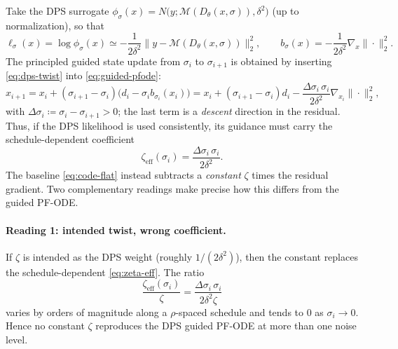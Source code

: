 \documentclass[11pt]{article}
\begin{document}
Take the DPS surrogate $\phi_\sigma(x)=N\!\bigl(y;\mathcal M(D_\theta(x,\sigma)),\delta^2\bigr)$
(up to normalization), so that
\begin{equation}\label{eq:dps-twist}
  \ell_\sigma(x) = \log\phi_\sigma(x)
  \simeq -\frac{1}{2\delta^2}\bigl\|y-\mathcal M(D_\theta(x,\sigma))\bigr\|_2^2,
  \qquad
  b_\sigma(x) = -\frac{1}{2\delta^2}\nabla_x\bigl\|\cdot\bigr\|_2^2 .
\end{equation}
The principled guided state update from $\sigma_i$ to $\sigma_{i+1}$ is obtained by inserting
\eqref{eq:dps-twist} into \eqref{eq:guided-pfode}:
\begin{equation}\label{eq:principled-update}
  x_{i+1} = x_i + (\sigma_{i+1}-\sigma_i)\bigl(d_i-\sigma_i b_{\sigma_i}(x_i)\bigr)
  = x_i + (\sigma_{i+1}-\sigma_i)d_i
  - \frac{\Delta\sigma_i\,\sigma_i}{2\delta^2}
  \nabla_{x_i}\bigl\|\cdot\bigr\|_2^2,
\end{equation}
with $\Delta\sigma_i\coloneqq\sigma_i-\sigma_{i+1}>0$; the last term is a \emph{descent} direction in
the residual. Thus, if the DPS likelihood is used consistently, its guidance must carry the
schedule-dependent coefficient
\begin{equation}\label{eq:zeta-eff}
  \zeta_{\mathrm{eff}}(\sigma_i) = \frac{\Delta\sigma_i\,\sigma_i}{2\delta^2}.
\end{equation}
The baseline \eqref{eq:code-flat} instead subtracts a \emph{constant} $\zeta$ times the residual
gradient. Two complementary readings make precise how this differs from the guided PF-ODE.

\paragraph{Reading 1: intended twist, wrong coefficient.}
If $\zeta$ is intended as the DPS weight (roughly $1/(2\delta^2)$), then the constant replaces the
schedule-dependent \eqref{eq:zeta-eff}. The ratio
\begin{equation}\label{eq:ratio}
  \frac{\zeta_{\mathrm{eff}}(\sigma_i)}{\zeta}
  = \frac{\Delta\sigma_i\,\sigma_i}{2\delta^2\zeta}
\end{equation}
varies by orders of magnitude along a $\rho$-spaced schedule and tends to $0$ as $\sigma_i\to0$.
Hence no constant $\zeta$ reproduces the DPS guided PF-ODE at more than one noise level.
\end{document}
